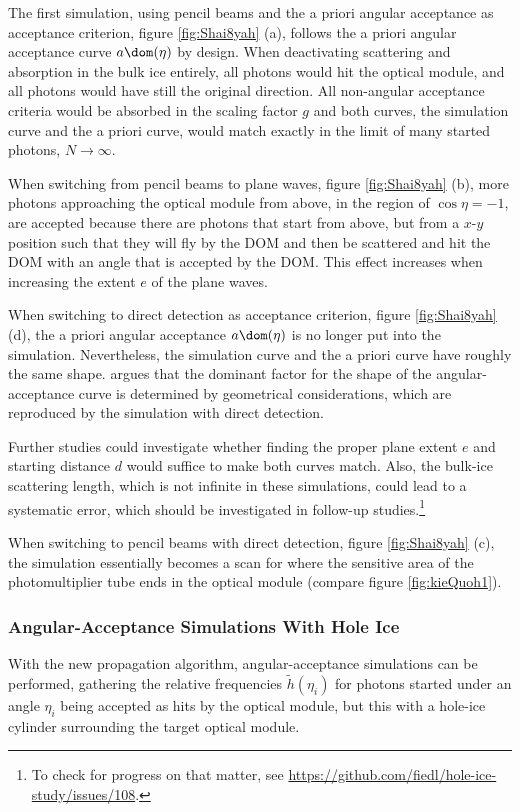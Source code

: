 The first simulation, using pencil beams and the a priori angular acceptance as acceptance criterion, figure \ref{fig:Shai8yah} (a), follows the a priori angular acceptance curve $a\dom(\eta)$ by design. When deactivating scattering and absorption in the bulk ice entirely, all photons would hit the optical module, and all photons would have still the original direction. All non-angular acceptance criteria would be absorbed in the scaling factor $g$ and both curves, the simulation curve and the a priori curve, would match exactly in the limit of many started photons, $N\rightarrow\infty$.

When switching from pencil beams to plane waves, figure \ref{fig:Shai8yah} (b), more photons approaching the optical module from above, in the region of $\cos \eta = -1$, are accepted because there are photons that start from above, but from a $x$-$y$ position such that they will fly by the DOM and then be scattered and hit the DOM with an angle that is accepted by the DOM. This effect increases when increasing the extent $e$ of the plane waves.


When switching to direct detection as acceptance criterion, figure \ref{fig:Shai8yah} (d), the a priori angular acceptance $a\dom(\eta)$ is no longer put into the simulation. Nevertheless, the simulation curve and the a priori curve have roughly the same shape. \rongen \cite{martindardupdate} argues that the dominant factor for the shape of the angular-acceptance curve is determined by geometrical considerations, which are reproduced by the simulation with direct detection.

Further studies could investigate whether finding the proper plane extent $e$ and starting distance $d$ would suffice to make both curves match. Also, the bulk-ice scattering length, which is not infinite in these simulations, could lead to a systematic error, which should be investigated in follow-up studies.\footnote{To check for progress on that matter, see \url{https://github.com/fiedl/hole-ice-study/issues/108}.}\followup

When switching to pencil beams with direct detection, figure \ref{fig:Shai8yah} (c), the simulation essentially becomes a scan for where the sensitive area of the photomultiplier tube ends in the optical module (compare figure \ref{fig:kieQuoh1}).


\subsubsection{Angular-Acceptance Simulations With Hole Ice}
\label{sec:angular_acceptance_simulations_with_hole_ice}\label{sec:hole_ice_approximation}
With the new propagation algorithm, angular-acceptance simulations can be performed, gathering the relative frequencies $\tilde{h}(\eta_i)$ for photons started under an angle $\eta_i$ being accepted as hits by the optical module, but this with a hole-ice cylinder surrounding the target optical module.

